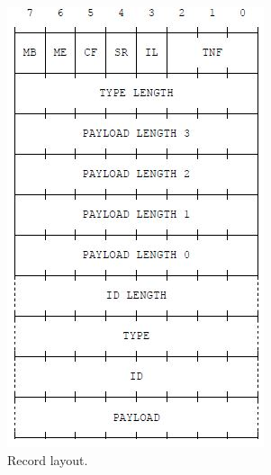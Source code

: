 \documentclass[11pt]{article}
\begin{document}
\begin{figure}[H]
\centering
\includegraphics[scale=0.7]{NDEF_record_layout.jpg}
\caption{Record layout.}
\label{fig:record_layout}
\end{figure}
\end{document}
